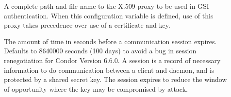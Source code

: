 \begin{description}
\item[]
\label{param:GSIDaemonProxy} A complete path and file name to the
X.509 proxy to be used in GSI authentication.
When this configuration variable is defined, use of this proxy
takes precedence over use of a certificate and key.

\item[]
\label{param:SessionDuration} The amount of time in seconds before
a communication session expires.
Defaults to 8640000 seconds (100 days) to avoid a bug in session
renegotiation for Condor Version 6.6.0.
A session is a record of necessary information to do communication
between a client and daemon, and is protected by a shared secret key.
The session expires to reduce the window of opportunity where
the key may be compromised by attack.

\end{description}



